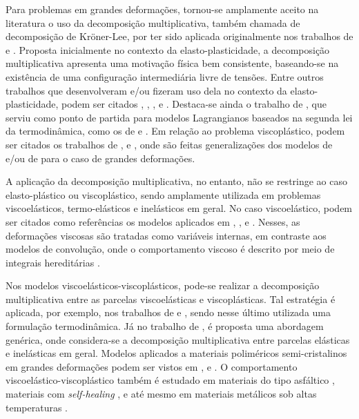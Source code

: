 \documentclass[Tese.tex]{subfiles}
\begin{document}
Para problemas em grandes deformações, tornou-se amplamente aceito na literatura o uso da decomposição multiplicativa, também chamada de decomposição de Kröner-Lee, por ter sido aplicada originalmente nos trabalhos de  e . Proposta inicialmente no contexto da elasto-plasticidade, a decomposição multiplicativa apresenta uma motivação física bem consistente, baseando-se na existência de uma configuração intermediária livre de tensões. Entre outros trabalhos que desenvolveram e/ou fizeram uso dela no contexto da elasto-plasticidade, podem ser citados , , ,  e . Destaca-se ainda o trabalho de , que serviu como ponto de partida para modelos Lagrangianos baseados na segunda lei da termodinâmica, como os de  e . Em relação ao problema viscoplástico, podem ser citados os trabalhos de ,  e , onde são feitas generalizações dos modelos de  e/ou de  para o caso de grandes deformações. %

A aplicação da decomposição multiplicativa, no entanto, não se restringe ao caso elasto-plástico ou viscoplástico, sendo amplamente utilizada em problemas viscoelásticos, termo-elásticos e inelásticos em geral. No caso viscoelástico, podem ser citados como referências os modelos aplicados em , ,  e . Nesses, as deformações viscosas são tratadas como variáveis internas, em contraste aos modelos de convolução, onde o comportamento viscoso é descrito por meio de integrais hereditárias \cite{Simo1987,lemaitre1985mechanics,Holzapfel1996,Lemaitre2001}.

Nos modelos viscoelásticos-viscoplásticos, pode-se realizar a decomposição multiplicativa entre as parcelas viscoelásticas e viscoplásticas. Tal estratégia é aplicada, por exemplo, nos trabalhos de  e , sendo nesse último utilizada uma formulação termodinâmica. Já no trabalho de , é proposta uma abordagem genérica, onde considera-se a decomposição multiplicativa entre parcelas elásticas e inelásticas em geral. Modelos aplicados a materiais poliméricos semi-cristalinos em grandes deformações podem ser vistos em ,  e . O comportamento viscoelástico-viscoplástico também é estudado em materiais do tipo asfáltico \cite{DRESCHER2010109,DARABI2011191}, materiais com \emph{self-healing} \cite{Shahsavari_2016}, e até mesmo em materiais metálicos sob altas temperaturas \cite{BENAARBIA2018100}. 
\end{document}
